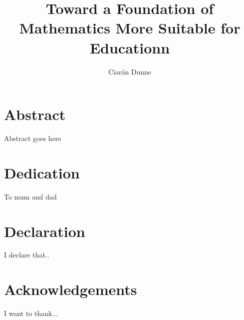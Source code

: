 \documentclass[12pt]{report}
\title{Toward a Foundation of Mathematics More Suitable for Educationn}
\author{Ciarán Dunne}
\begin{document}
\maketitle
\chapter*{Abstract}
Abstract goes here

\chapter*{Dedication}
To mum and dad

\chapter*{Declaration}
I declare that..

\chapter*{Acknowledgements}
I want to thank...

\tableofcontents



\begin{comment}
Abstract, Aims, Objectives,
Project Description
Are these clearly expressed, testable, and
achievable?
\end{comment}
\end{document}
